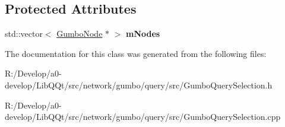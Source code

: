\subsection*{Protected Attributes}
\begin{DoxyCompactItemize}
\item 
\mbox{\label{class_gumbo_query_selection_acd69c0849eaf83ec18a8db4e93f6a9a8}} 
std\+::vector$<$ \mbox{\hyperlink{gumbo_8h_a5f67d8397fda8fb7c90cc27f14ac4e7d}{Gumbo\+Node}} $\ast$ $>$ {\bfseries m\+Nodes}
\end{DoxyCompactItemize}


The documentation for this class was generated from the following files\+:\begin{DoxyCompactItemize}
\item 
R\+:/\+Develop/a0-\/develop/\+Lib\+Q\+Qt/src/network/gumbo/query/src/Gumbo\+Query\+Selection.\+h\item 
R\+:/\+Develop/a0-\/develop/\+Lib\+Q\+Qt/src/network/gumbo/query/src/Gumbo\+Query\+Selection.\+cpp\end{DoxyCompactItemize}
